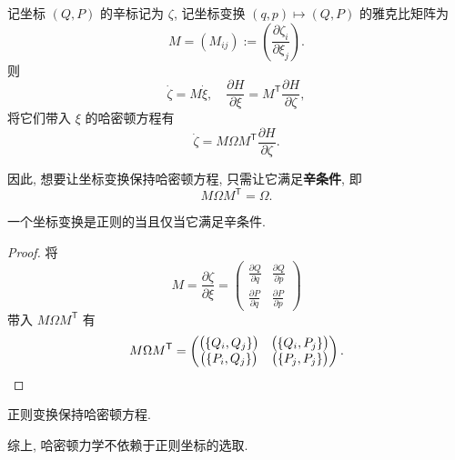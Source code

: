 记坐标 $ (Q,P) $ 的辛标记为 $ \zeta $, 记坐标变换 $ (q,p)\mapsto(Q,P) $ 的雅克比矩阵为 
\[ M=(M_{ij}):=\left(\dfrac{\partial\zeta_i}{\partial\xi_j}\right).\] 则
\[ \dot{\zeta}=M\dot{\xi},\quad \frac{\partial H}{\partial\xi}=M^{\mathsf{T}}\frac{\partial H}{\partial\zeta}, \]
将它们带入 $ \xi $ 的哈密顿方程有
\[ \dot{\zeta}=M\Omega M^{\mathsf{T}}\frac{\partial H}{\partial\zeta}. \]

因此, 想要让坐标变换保持哈密顿方程, 只需让它满足{\bf 辛条件}, 即
\[ M\Omega M^{\mathsf{T}}=\Omega. \]

\begin{theorem}
    一个坐标变换是正则的当且仅当它满足辛条件.
\end{theorem}
\begin{proof}
    将
    \[ M=\frac{\partial\zeta}{\partial\xi}=\left( \begin{matrix}
        \frac{\partial Q}{\partial q} & \frac{\partial Q}{\partial p}\\ 
        \frac{\partial P}{\partial q} & \frac{\partial P}{\partial p}
    \end{matrix} \right) \]
    带入 $ M\Omega M^{\mathsf{T}} $ 有
    \[M\Omega M^{\mathsf{T}} = \left( \begin{matrix}
            \big(\{Q_i,Q_j\}\big) & \big(\{Q_i,P_j\}\big) \\ 
            \big(\{P_i,Q_j\}\big) & \big(\{P_j,P_j\}\big)
        \end{matrix} \right).\qedhere\]
\end{proof}
\begin{corollary}
    正则变换保持哈密顿方程.
\end{corollary}

综上, 哈密顿力学不依赖于正则坐标的选取.